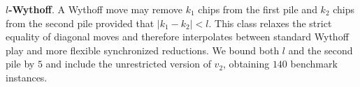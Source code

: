 \documentclass[review]{elsarticle}
\newcommand{\set}[1]{\{ #1 \}}
\newcommand{\tuple}[1]{\langle {#1} \rangle}
\newcommand{\true}{\top}
\newcommand{\statevar}{\mathcal{X}}
\newcommand{\act}{\mathcal{A}}
\newcommand{\constraint}{\mathcal{C}}
\newcommand{\estate}{\mathcal{E}}
\newcommand{\pre}{\mathtt{pre}}
\newcommand{\eff}{\mathtt{eff}}
\begin{document}
{\color{red}\textbf{$l$-Wythoff}. A Wythoff move may remove $k_1$ chips from the first pile and $k_2$ chips from the second pile provided that $|k_1-k_2|<l$.}
{\color{red}This class relaxes the strict equality of diagonal moves and therefore interpolates between standard Wythoff play and more flexible synchronized reductions.}
{\color{red}We bound both $l$ and the second pile by $5$ and include the unrestricted version of $v_2$, obtaining $140$ benchmark instances.}
\end{document}
